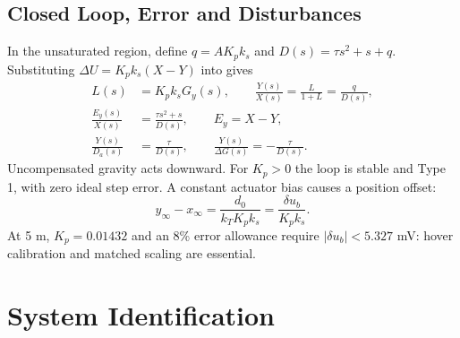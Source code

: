 \subsection{Closed Loop, Error and Disturbances}
In the unsaturated region, define $q=AK_pk_s$ and $D(s)=\tau s^2+s+q$. Substituting $\Delta U=K_pk_s(X-Y)$ into  gives
\begin{align}
L(s)&=K_pk_sG_y(s),\qquad \frac{Y(s)}{X(s)}=\frac{L}{1+L}=\frac{q}{D(s)},\label{eq:tracking}\\
\frac{E_y(s)}{X(s)}&=\frac{\tau s^2+s}{D(s)},\qquad E_y=X-Y,\\
\frac{Y(s)}{D_a(s)}&=\frac{\tau}{D(s)},\qquad \frac{Y(s)}{\Delta G(s)}=-\frac{\tau}{D(s)}.
\end{align}
Uncompensated gravity acts downward. For $K_p>0$ the loop is stable and Type 1, with zero ideal step error. A constant actuator bias causes a position offset:
\begin{equation}\label{eq:bias}
y_\infty-x_\infty=\frac{d_0}{k_TK_pk_s}=\frac{\delta u_b}{K_pk_s}.
\end{equation}
At 5 m, $K_p=0.01432$ and an 8\% error allowance require $|\delta u_b|<5.327$ mV: hover calibration and matched scaling are essential.
\page

\section{System Identification}\label{sec:id}
